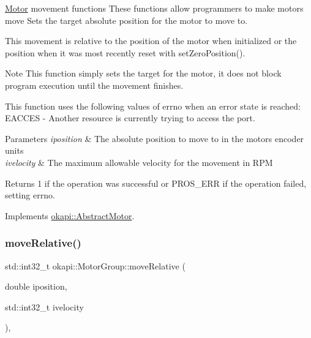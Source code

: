 \mbox{\hyperlink{classokapi_1_1Motor}{Motor}} movement functions These functions allow programmers to make motors move Sets the target absolute position for the motor to move to.

This movement is relative to the position of the motor when initialized or the position when it was most recently reset with set\+Zero\+Position().

\begin{DoxyNote}{Note}
This function simply sets the target for the motor, it does not block program execution until the movement finishes.
\end{DoxyNote}
This function uses the following values of errno when an error state is reached\+: E\+A\+C\+C\+ES -\/ Another resource is currently trying to access the port.


\begin{DoxyParams}{Parameters}
{\em iposition} & The absolute position to move to in the motor\textquotesingle{}s encoder units \\
\hline
{\em ivelocity} & The maximum allowable velocity for the movement in R\+PM \\
\hline
\end{DoxyParams}
\begin{DoxyReturn}{Returns}
1 if the operation was successful or P\+R\+O\+S\+\_\+\+E\+RR if the operation failed, setting errno. 
\end{DoxyReturn}


Implements \mbox{\hyperlink{classokapi_1_1AbstractMotor_ab84ff0f3e39fa14dcf74bcc867863ff8}{okapi\+::\+Abstract\+Motor}}.

\mbox{\label{classokapi_1_1MotorGroup_a4295103133b5cb721dfb457a8cc8c2bc}} 
\subsubsection{\texorpdfstring{moveRelative()}{moveRelative()}}
{\footnotesize\ttfamily std\+::int32\+\_\+t okapi\+::\+Motor\+Group\+::move\+Relative (\begin{DoxyParamCaption}\item[{double}]{iposition,  }\item[{std\+::int32\+\_\+t}]{ivelocity }\end{DoxyParamCaption})\hspace{0.3cm}{\ttfamily [override]}, {\ttfamily [virtual]}}

